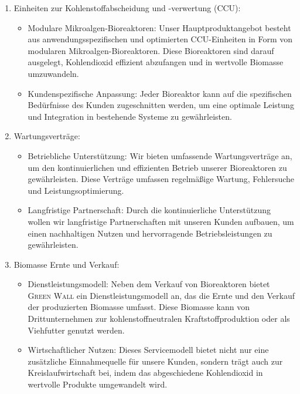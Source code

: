 \begin{enumerate}
    \item Einheiten zur Kohlenstoffabscheidung und -verwertung (CCU):
          \begin{itemize}
              \item Modulare Mikroalgen-Bioreaktoren: Unser Hauptproduktangebot besteht aus anwendungsspezifischen und optimierten CCU-Einheiten in Form von modularen Mikroalgen-Bioreaktoren.
                    Diese Bioreaktoren sind darauf ausgelegt, Kohlendioxid effizient abzufangen und in wertvolle Biomasse umzuwandeln.
              \item Kundenspezifische Anpassung: Jeder Bioreaktor kann auf die spezifischen Bedürfnisse des Kunden zugeschnitten werden, um eine optimale Leistung und Integration in bestehende Systeme zu gewährleisten.
          \end{itemize}
    \item Wartungsverträge:
          \begin{itemize}
              \item Betriebliche Unterstützung: Wir bieten umfassende Wartungsverträge an, um den kontinuierlichen und effizienten Betrieb unserer Bioreaktoren zu gewährleisten.
                    Diese Verträge umfassen regelmäßige Wartung, Fehlersuche und Leistungsoptimierung.
              \item Langfristige Partnerschaft: Durch die kontinuierliche Unterstützung wollen wir langfristige Partnerschaften mit unseren Kunden aufbauen, um einen nachhaltigen Nutzen und hervorragende Betriebsleistungen zu gewährleisten.
          \end{itemize}
    \item Biomasse Ernte und Verkauf:
          \begin{itemize}
              \item Dienstleistungsmodell: Neben dem Verkauf von Bioreaktoren bietet \textsc{Green Wall} ein Dienstleistungsmodell an, das die Ernte und den Verkauf der produzierten Biomasse umfasst.
                    Diese Biomasse kann von Drittunternehmen zur kohlenstoffneutralen Kraftstoffproduktion oder als Viehfutter genutzt werden.
              \item Wirtschaftlicher Nutzen: Dieses Servicemodell bietet nicht nur eine zusätzliche Einnahmequelle für unsere Kunden, sondern trägt auch zur Kreislaufwirtschaft bei, indem das abgeschiedene Kohlendioxid in wertvolle Produkte umgewandelt wird.
          \end{itemize}
\end{enumerate}

